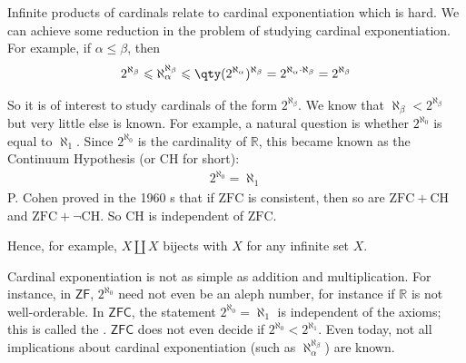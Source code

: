 Infinite products of cardinals relate to cardinal exponentiation which is hard. We can achieve some reduction in the problem of studying cardinal exponentiation. For example, if $\alpha \leqslant \beta$, then
\begin{align*}
    2^{\aleph_\beta} \leqslant \aleph_\alpha^{\aleph_\beta} \leqslant\qty(2^{\aleph_\alpha})^{\aleph_\beta}=2^{\aleph_\alpha \cdot \aleph_\beta}=2^{\aleph_\beta}
\end{align*}

So it is of interest to study cardinals of the form $2^{\aleph_\beta}$. We know that $\aleph_\beta<2^{\aleph_\beta}$ but very little else is known. For example, a natural question is whether $2^{\aleph_0}$ is equal to $\aleph_1$. Since $2^{\aleph_0}$ is the cardinality of $\mathbb{R}$, this became known as the Continuum Hypothesis (or $\mathrm{CH}$ for short):
\begin{align*}
    2^{\aleph_0}=\aleph_1
\end{align*}
P. Cohen proved in the 1960 s that if $\mathrm{ZFC}$ is consistent, then so are $\mathrm{ZFC}+\mathrm{CH}$ and $\mathrm{ZFC}+\neg \mathrm{CH}$. So $\mathrm{CH}$ is independent of $\mathrm{ZFC}$.

Hence, for example, $X \amalg X$ bijects with $X$ for any infinite set $X$.

Cardinal exponentiation is not as simple as addition and multiplication.
For instance, in $\mathsf{ZF}$, $2^{\aleph_0}$ need not even be an aleph number, for instance if $\mathbb R$ is not well-orderable.
In $\mathsf{ZFC}$, the statement $2^{\aleph_0} = \aleph_1$ is independent of the axioms; this is called the .
$\mathsf{ZFC}$ does not even decide if $2^{\aleph_0} < 2^{\aleph_1}$.
Even today, not all implications about cardinal exponentiation (such as $\aleph_\alpha^{\aleph_\beta}$) are known.